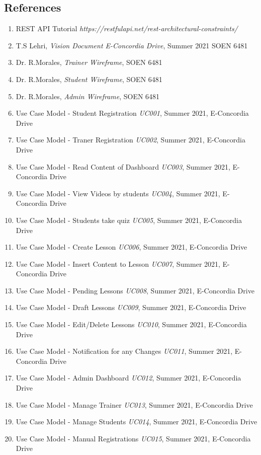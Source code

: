 \documentclass{report}
\begin{document}
\subsection{ References}
\begin{enumerate}
    \item {\footnotesize REST API Tutorial \textit{https://restfulapi.net/rest-architectural-constraints/}}
    \item {\footnotesize T.S Lehri, \textit{Vision Document E-Concordia Drive}, Summer 2021 SOEN 6481}
    \item {\footnotesize Dr. R.Morales, \textit{Trainer Wireframe}, SOEN 6481}
    \item {\footnotesize Dr. R.Morales, \textit{Student Wireframe}, SOEN 6481}
    \item {\footnotesize Dr. R.Morales, \textit{Admin Wireframe}, SOEN 6481}
    \item {\footnotesize Use Case Model - Student Registration \textit{UC001}, Summer 2021, E-Concordia Drive}
    \item {\footnotesize Use Case Model - Traner Registration \textit{UC002}, Summer 2021, E-Concordia Drive}
    \item {\footnotesize Use Case Model - Read Content of Dashboard \textit{UC003}, Summer 2021, E-Concordia Drive}
    \item {\footnotesize Use Case Model - View Videos by students \textit{UC004}, Summer 2021, E-Concordia Drive}
    \item {\footnotesize Use Case Model - Students take quiz \textit{UC005}, Summer 2021, E-Concordia Drive}
    \item {\footnotesize Use Case Model - Create Lesson \textit{UC006}, Summer 2021, E-Concordia Drive}
    \item {\footnotesize Use Case Model - Insert Content to Lesson \textit{UC007}, Summer 2021, E-Concordia Drive}
    \item {\footnotesize Use Case Model - Pending Lessons \textit{UC008}, Summer 2021, E-Concordia Drive}
    \item {\footnotesize Use Case Model - Draft Lessons \textit{UC009}, Summer 2021, E-Concordia Drive}
    \item {\footnotesize Use Case Model - Edit/Delete Lessons \textit{UC010}, Summer 2021, E-Concordia Drive}
    \item {\footnotesize Use Case Model - Notification for any Changes \textit{UC011}, Summer 2021, E-Concordia Drive}
    \item {\footnotesize Use Case Model - Admin Dashboard \textit{UC012}, Summer 2021, E-Concordia Drive}
    \item {\footnotesize Use Case Model - Manage Trainer \textit{UC013}, Summer 2021, E-Concordia Drive}
    \item {\footnotesize Use Case Model - Manage Students \textit{UC014}, Summer 2021, E-Concordia Drive}
    \item {\footnotesize Use Case Model - Manual Registrations \textit{UC015}, Summer 2021, E-Concordia Drive}
    
\end{enumerate}
\end{document}
